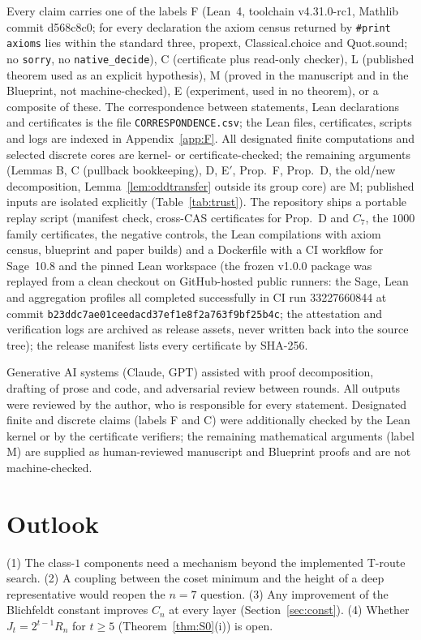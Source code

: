 \documentclass[11pt]{amsart}
\theoremstyle{remark}\newtheorem{remark}[theorem]{Remark}
\theoremstyle{definition}\newtheorem{definition}[theorem]{Definition}
\begin{document}
Every claim carries one of the labels F (Lean~4, toolchain v4.31.0-rc1, Mathlib commit d568c8c0; for every declaration the axiom census returned by \texttt{\#print axioms} lies within the standard three, propext, Classical.choice and Quot.sound; no \texttt{sorry}, no \texttt{native\_decide}), C (certificate plus read-only checker), L (published theorem used as an explicit hypothesis), M (proved in the manuscript and in the Blueprint, not machine-checked), E (experiment, used in no theorem), or a composite of these. The correspondence between statements, Lean declarations and certificates is the file \texttt{CORRESPONDENCE.csv}; the Lean files, certificates, scripts and logs are indexed in Appendix~\ref{app:F}. All designated finite computations and selected discrete cores are kernel- or certificate-checked; the remaining arguments (Lemmas B, C (pullback bookkeeping), D, E$'$, Prop.~F, Prop.~D, the old/new decomposition, Lemma~\ref{lem:oddtransfer} outside its group core) are M; published inputs are isolated explicitly (Table~\ref{tab:trust}). The repository ships a portable replay script (manifest check, cross-CAS certificates for Prop.~D and $C_7$, the $1000$ family certificates, the negative controls, the Lean compilations with axiom census, blueprint and paper builds) and a Dockerfile with a CI workflow for Sage~10.8 and the pinned Lean workspace (the frozen v1.0.0 package was replayed from a clean checkout on GitHub-hosted public runners: the Sage, Lean and aggregation profiles all completed successfully in CI run 33227660844 at commit \texttt{b23ddc7ae01ceedacd37ef1e8f2a763f9bf25b4c}; the attestation and verification logs are archived as release assets, never written back into the source tree); the release manifest lists every certificate by SHA-256.

Generative AI systems (Claude, GPT) assisted with proof decomposition, drafting of prose and code, and adversarial review between rounds. All outputs were reviewed by the author, who is responsible for every statement. Designated finite and discrete claims (labels F and C) were additionally checked by the Lean kernel or by the certificate verifiers; the remaining mathematical arguments (label M) are supplied as human-reviewed manuscript and Blueprint proofs and are not machine-checked.

\section{Outlook}
(1) The class-$1$ components need a mechanism beyond the implemented T-route search. (2) A coupling between the coset minimum and the height of a deep representative would reopen the $n=7$ question. (3) Any improvement of the Blichfeldt constant improves $C_n$ at every layer (Section~\ref{sec:const}). (4) Whether $J_t=2^{t-1}R_n$ for $t\ge5$ (Theorem~\ref{thm:S0}(i)) is open.
\end{document}
